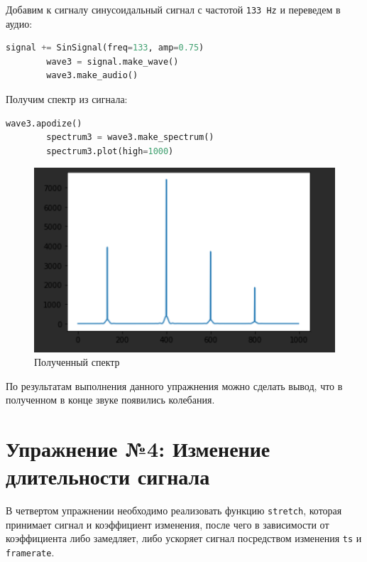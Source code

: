 \documentclass[a4]{article}
\begin{document}
    Добавим к сигналу синусоидальный сигнал с частотой \texttt{133 Hz} и переведем в аудио:

    \begin{lstlisting}[language=Python, caption= Получение спектра, label={lst:add_sin_133}]
        signal += SinSignal(freq=133, amp=0.75)
        wave3 = signal.make_wave()
        wave3.make_audio()
    \end{lstlisting}

    Получим спектр из сигнала:

    \begin{lstlisting}[language=Python, caption= Полученый спектр, label={lst:spectr_133}]
        wave3.apodize()
        spectrum3 = wave3.make_spectrum()
        spectrum3.plot(high=1000)
    \end{lstlisting}

    \begin{figure}[H]
        \centering
        \includegraphics[width=\textwidth]{spectr_133}
        \caption{Полученный спектр}
        \label{fig:spectr_133}
    \end{figure}

    По результатам выполнения данного упражнения можно сделать вывод, что в полученном в конце звуке появились колебания.

    \newpage


    \section{Упражнение №4: Изменение длительности сигнала}
    \label{sec:4_stretch}
    В четвертом упражнении необходимо реализовать функцию \texttt{stretch}, которая принимает сигнал и коэффициент изменения, после чего в зависимости от коэффициента либо замедляет, либо ускоряет сигнал посредством изменения \texttt{ts} и \texttt{framerate}.
\end{document}
